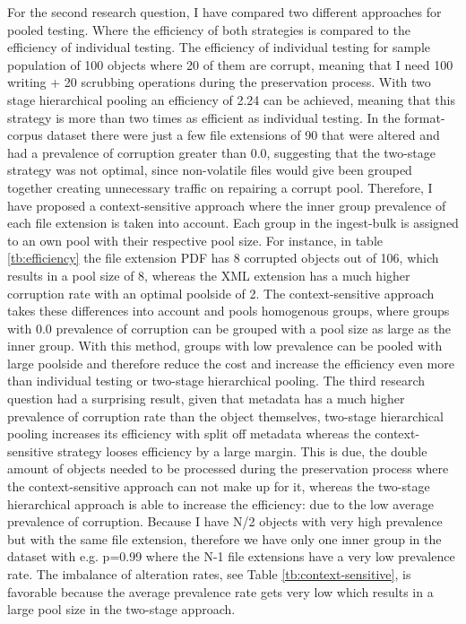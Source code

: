 For the second research question, I have compared two different approaches for pooled testing. Where the efficiency of both strategies is compared to the efficiency of individual testing. The efficiency of individual testing for sample population of 100 objects where 20 of them are corrupt, meaning that I need 100 writing  + 20 scrubbing operations during the preservation process. With two stage hierarchical pooling an efficiency of 2.24 can be achieved, meaning that this strategy is more than two times as efficient as individual testing. In the format-corpus dataset there were just a few file extensions of 90 that were altered and had a prevalence of corruption greater than 0.0, suggesting that the two-stage strategy was not optimal, since non-volatile files would give been grouped together creating unnecessary traffic on repairing a corrupt pool. Therefore, I have proposed a context-sensitive approach where the inner group prevalence of each file extension is taken into account. Each group in the ingest-bulk is assigned to an own pool with their respective pool size. For instance, in table \ref{tb:efficiency} the file extension PDF has 8 corrupted objects out of 106, which results in a pool size of 8, whereas the XML extension has a much higher corruption rate with an optimal poolside of 2. The context-sensitive approach takes these differences into account and pools homogenous groups, where groups with 0.0 prevalence of corruption can be grouped with a pool size as large as the inner group. With this method, groups with low prevalence can be pooled with large poolside and therefore reduce the cost and increase the efficiency even more than individual testing or two-stage hierarchical pooling.
The third research question had a surprising result, given that metadata has a much higher prevalence of corruption rate than the object themselves, two-stage hierarchical pooling increases its efficiency with split off metadata whereas the context-sensitive strategy looses efficiency by a large margin. This is due, the double amount of objects needed to be processed during the preservation process where the context-sensitive approach can not make up for it, whereas the two-stage hierarchical approach is able to increase the efficiency: due to the low average prevalence of corruption. Because I have N/2 objects with very high prevalence but with the same file extension, therefore we have only one inner group in the dataset with e.g. p=0.99 where the N-1 file extensions have a very low prevalence rate. The imbalance of alteration rates, see Table \ref{tb:context-sensitive}, is favorable because the average prevalence rate gets very low which results in a large pool size in the two-stage approach.
